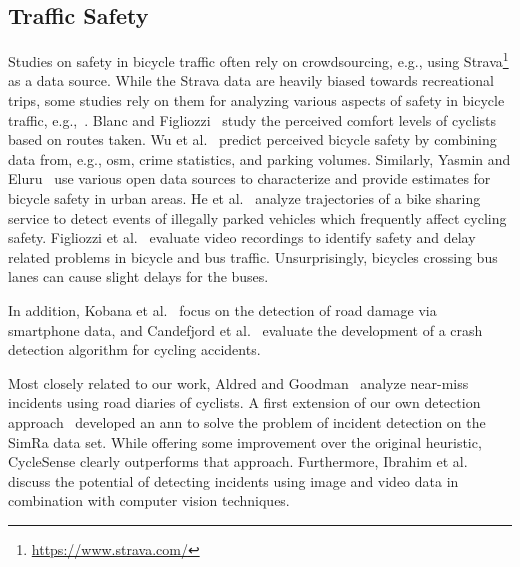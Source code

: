 \subsection{Traffic Safety\label{subsec:trafficsafety}}
Studies on safety in bicycle traffic often rely on crowdsourcing, e.g., using Strava\footnote{\url{https://www.strava.com/}} as a data source.
While the Strava data are heavily biased towards recreational trips, some studies rely on them for analyzing various aspects of safety in bicycle traffic, e.g.,~\cite{hochmair2019estimating,ferster2021mapping}.
Blanc and Figliozzi~\cite{blanc2016modeling, blanc2017safety} study the perceived comfort levels of cyclists based on routes taken.
Wu et al.~\cite{wu2018predicting} predict perceived bicycle safety by combining data from, e.g., \ac{osm}, crime statistics, and parking volumes.
Similarly, Yasmin and Eluru~\cite{yasmin2016latent} use various open data sources to characterize and provide estimates for bicycle safety in urban areas.
He et al.~\cite{he2018detecting} analyze trajectories of a bike sharing service to detect events of illegally parked vehicles which frequently affect cycling safety.
Figliozzi et al.~\cite{figliozzi2019evaluation} evaluate video recordings to identify safety and delay related problems in bicycle and bus traffic.
Unsurprisingly, bicycles crossing bus lanes can cause slight delays for the buses.

In addition, Kobana et al.~\cite{kobana2014detection} focus on the detection of road damage via smartphone data, and Candefjord et al.~\cite{candefjord2014using} evaluate the development of a crash detection algorithm for cycling accidents.

Most closely related to our work, Aldred and Goodman~\cite{aldred2018predictors} analyze near-miss incidents using road diaries of cyclists.
A first extension of our own detection approach~\cite{sanchez2020detecting} developed an \ac{ann} to solve the problem of incident detection on the SimRa data set.
While offering some improvement over the original heuristic, CycleSense clearly outperforms that approach.
Furthermore, Ibrahim et al.~\cite{ibrahim2021cycling} discuss the potential of detecting incidents using image and video data in combination with computer vision techniques.

